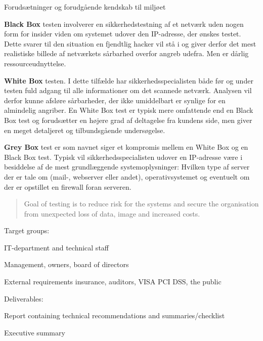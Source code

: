 \documentclass[Screen16to9,17pt]{foils}
\begin{document}


\begin{list2}
\item Forudsætninger og forudgående kendskab til miljøet
\item {\bf Black Box} testen involverer en sikkerhedstestning af et netværk uden
nogen form for insider viden om systemet udover den IP-adresse, der
ønskes testet. Dette svarer til den situation en fjendtlig hacker vil
stå i og giver derfor det mest realistiske billede af netværkets
sårbarhed overfor angreb udefra. Men er dårlig ressourceudnyttelse.
\item {\bf White Box} testen. I dette tilfælde
har sikkerhedsspecialisten både før og under testen fuld adgang til
alle informationer om det scannede netværk. Analysen vil derfor kunne
afsløre sårbarheder, der ikke umiddelbart er synlige for en almindelig
angriber. En White Box test er typisk mere omfattende end en Black Box
test og forudsætter en højere grad af deltagelse fra kundens side, men
giver en meget detaljeret og tilbundsgående undersøgelse.

\item {\bf Grey Box} test er som navnet siger et kompromis mellem en White Box
og en Black Box test. Typisk vil sikkerhedsspecialisten udover en
IP-adresse være i besiddelse af de mest grundlæggende
systemoplysninger: Hvilken type af server der er tale om (mail-,
webserver eller andet), operativsystemet og eventuelt om der er
opstillet en firewall foran serveren.
\end{list2}



\begin{quote}
Goal of testing is to reduce risk for the systems and secure the organisation\\ from unexpected loss of data, image and increased costs.
\end{quote}

\begin{list1}
\item Target groups:
\begin{list2}
\item IT-department and technical staff
\item Management, owners, board of directors
\item External requirements insurance, auditors, VISA PCI DSS, the public
\end{list2}
\item Deliverables:
\begin{list2}
\item Report containing technical recommendations and summaries/checklist
\item Executive summary
\end{list2}
\end{list1}
\end{document}
